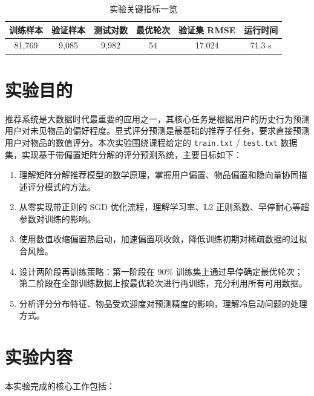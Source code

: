 \documentclass[UTF8,a4paper,10pt]{ctexart}
\newcommand{\xiaosi}{\fontsize{12pt}{20pt}\selectfont}
\begin{document}
\begin{table}[H]
  \centering
  \caption{实验关键指标一览}
  \begin{tabular}{c c c c c c}
    \toprule
    \textbf{训练样本} & \textbf{验证样本} & \textbf{测试对数} & \textbf{最优轮次} & \textbf{验证集 RMSE} & \textbf{运行时间} \\
    \midrule
    81,769 & 9,085 & 9,982 & 54 & 17.024 & 71.3 s \\
    \bottomrule
  \end{tabular}
\end{table}

\section{实验目的}
\xiaosi

推荐系统是大数据时代最重要的应用之一，其核心任务是根据用户的历史行为预测用户对未见物品的偏好程度。显式评分预测是最基础的推荐子任务，要求直接预测用户对物品的数值评分。本次实验围绕课程给定的 \texttt{train.txt} / \texttt{test.txt} 数据集，实现基于带偏置矩阵分解的评分预测系统，主要目标如下：

\begin{enumerate}
  \item 理解矩阵分解推荐模型的数学原理，掌握用户偏置、物品偏置和隐向量协同描述评分模式的方法。
  \item 从零实现带正则的 SGD 优化流程，理解学习率、L2 正则系数、早停耐心等超参数对训练的影响。
  \item 使用数值收缩偏置热启动，加速偏置项收敛，降低训练初期对稀疏数据的过拟合风险。
  \item 设计两阶段再训练策略：第一阶段在 90\% 训练集上通过早停确定最优轮次；第二阶段在全部训练数据上按最优轮次进行再训练，充分利用所有可用数据。
  \item 分析评分分布特征、物品受欢迎度对预测精度的影响，理解冷启动问题的处理方式。
\end{enumerate}

\section{实验内容}
\xiaosi

本实验完成的核心工作包括：
\end{document}
